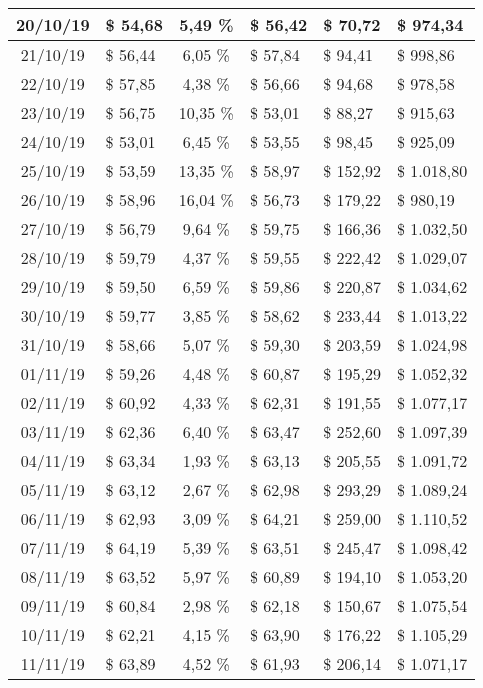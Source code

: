 \begin{center}
\begin{small}
\begin{longtable}{|c|l|c|l|l|l|}
20/10/19 & \$ 54,68 & 5,49 \% & \$ 56,42 & \$ 70,72 & \$ 974,34 \\ \hline
21/10/19 & \$ 56,44 & 6,05 \% & \$ 57,84 & \$ 94,41 & \$ 998,86 \\ \hline
22/10/19 & \$ 57,85 & 4,38 \% & \$ 56,66 & \$ 94,68 & \$ 978,58 \\ \hline
23/10/19 & \$ 56,75 & 10,35 \% & \$ 53,01 & \$ 88,27 & \$ 915,63 \\ \hline
24/10/19 & \$ 53,01 & 6,45 \% & \$ 53,55 & \$ 98,45 & \$ 925,09 \\ \hline
25/10/19 & \$ 53,59 & 13,35 \% & \$ 58,97 & \$ 152,92 & \$ 1.018,80 \\ \hline
26/10/19 & \$ 58,96 & 16,04 \% & \$ 56,73 & \$ 179,22 & \$ 980,19 \\ \hline
27/10/19 & \$ 56,79 & 9,64 \% & \$ 59,75 & \$ 166,36 & \$ 1.032,50 \\ \hline
28/10/19 & \$ 59,79 & 4,37 \% & \$ 59,55 & \$ 222,42 & \$ 1.029,07 \\ \hline
29/10/19 & \$ 59,50 & 6,59 \% & \$ 59,86 & \$ 220,87 & \$ 1.034,62 \\ \hline
30/10/19 & \$ 59,77 & 3,85 \% & \$ 58,62 & \$ 233,44 & \$ 1.013,22 \\ \hline
31/10/19 & \$ 58,66 & 5,07 \% & \$ 59,30 & \$ 203,59 & \$ 1.024,98 \\ \hline
01/11/19 & \$ 59,26 & 4,48 \% & \$ 60,87 & \$ 195,29 & \$ 1.052,32 \\ \hline
02/11/19 & \$ 60,92 & 4,33 \% & \$ 62,31 & \$ 191,55 & \$ 1.077,17 \\ \hline
03/11/19 & \$ 62,36 & 6,40 \% & \$ 63,47 & \$ 252,60 & \$ 1.097,39 \\ \hline
04/11/19 & \$ 63,34 & 1,93 \% & \$ 63,13 & \$ 205,55 & \$ 1.091,72 \\ \hline
05/11/19 & \$ 63,12 & 2,67 \% & \$ 62,98 & \$ 293,29 & \$ 1.089,24 \\ \hline
06/11/19 & \$ 62,93 & 3,09 \% & \$ 64,21 & \$ 259,00 & \$ 1.110,52 \\ \hline
07/11/19 & \$ 64,19 & 5,39 \% & \$ 63,51 & \$ 245,47 & \$ 1.098,42 \\ \hline
08/11/19 & \$ 63,52 & 5,97 \% & \$ 60,89 & \$ 194,10 & \$ 1.053,20 \\ \hline
09/11/19 & \$ 60,84 & 2,98 \% & \$ 62,18 & \$ 150,67 & \$ 1.075,54 \\ \hline
10/11/19 & \$ 62,21 & 4,15 \% & \$ 63,90 & \$ 176,22 & \$ 1.105,29 \\ \hline
11/11/19 & \$ 63,89 & 4,52 \% & \$ 61,93 & \$ 206,14 & \$ 1.071,17 \\ \hline

\end{longtable}
\end{small}
\end{center}
